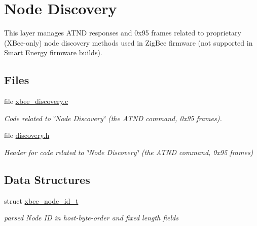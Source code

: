 \hypertarget{group__xbee__discovery}{\section{Node Discovery}
\label{group__xbee__discovery}
}


This layer manages A\-T\-N\-D responses and 0x95 frames related to proprietary (X\-Bee-\/only) node discovery methods used in Zig\-Bee firmware (not supported in Smart Energy firmware builds).  


\subsection*{Files}
\begin{DoxyCompactItemize}
\item 
file \hyperlink{xbee__discovery_8c}{xbee\-\_\-discovery.\-c}
\begin{DoxyCompactList}\small\item\em Code related to \char`\"{}\-Node Discovery\char`\"{} (the A\-T\-N\-D command, 0x95 frames). \end{DoxyCompactList}\item 
file \hyperlink{discovery_8h}{discovery.\-h}
\begin{DoxyCompactList}\small\item\em Header for code related to \char`\"{}\-Node Discovery\char`\"{} (the A\-T\-N\-D command, 0x95 frames) \end{DoxyCompactList}\end{DoxyCompactItemize}
\subsection*{Data Structures}
\begin{DoxyCompactItemize}
\item 
struct \hyperlink{structxbee__node__id__t}{xbee\-\_\-node\-\_\-id\-\_\-t}
\begin{DoxyCompactList}\small\item\em parsed Node I\-D in host-\/byte-\/order and fixed length fields \end{DoxyCompactList}\end{DoxyCompactItemize}
